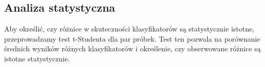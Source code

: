 \documentclass[runningheads]{llncs}
\begin{document}
\subsection{Analiza statystyczna}
Aby określić, czy różnice w skuteczności klasyfikatorów są statystycznie istotne, przeprowadzamy test t-Studenta dla par próbek. Test ten pozwala na porównanie średnich wyników różnych klasyfikatorów i określenie, czy obserwowane różnice są istotne statystycznie.
\begin{credits}

\end{credits}
%
%
%
% 
% 
%


\end{document}
